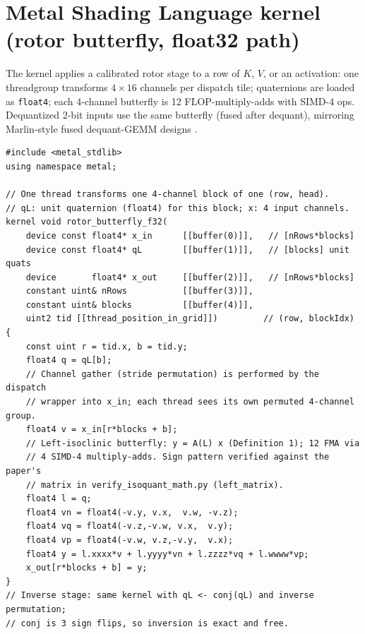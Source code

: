 \documentclass{article}
\begin{document}



\appendix

\section{Metal Shading Language kernel (rotor butterfly, float32 path)}
\label{app:msl}

The kernel applies a calibrated rotor stage to a row of $K$, $V$, or an
activation: one threadgroup transforms $4\times16$ channels per dispatch
tile; quaternions are loaded as \texttt{float4}; each 4-channel butterfly is
12 FLOP-multiply-adds with SIMD-4 ops. Dequantized 2-bit inputs use the same
butterfly (fused after dequant), mirroring Marlin-style fused dequant-GEMM
designs \citep{frantar2024marlin}.

\begin{lstlisting}[language=MSL,caption={Rotary-butterfly stage (left-rotor variant), MSL 3.1.}]
#include <metal_stdlib>
using namespace metal;

// One thread transforms one 4-channel block of one (row, head).
// qL: unit quaternion (float4) for this block; x: 4 input channels.
kernel void rotor_butterfly_f32(
    device const float4* x_in      [[buffer(0)]],   // [nRows*blocks]
    device const float4* qL        [[buffer(1)]],   // [blocks] unit quats
    device       float4* x_out     [[buffer(2)]],   // [nRows*blocks]
    constant uint& nRows           [[buffer(3)]],
    constant uint& blocks          [[buffer(4)]],
    uint2 tid [[thread_position_in_grid]])         // (row, blockIdx)
{
    const uint r = tid.x, b = tid.y;
    float4 q = qL[b];
    // Channel gather (stride permutation) is performed by the dispatch
    // wrapper into x_in; each thread sees its own permuted 4-channel group.
    float4 v = x_in[r*blocks + b];
    // Left-isoclinic butterfly: y = A(L) x (Definition 1); 12 FMA via
    // 4 SIMD-4 multiply-adds. Sign pattern verified against the paper's
    // matrix in verify_isoquant_math.py (left_matrix).
    float4 l = q;
    float4 vn = float4(-v.y, v.x,  v.w, -v.z);
    float4 vq = float4(-v.z,-v.w, v.x,  v.y);
    float4 vp = float4(-v.w, v.z,-v.y,  v.x);
    float4 y = l.xxxx*v + l.yyyy*vn + l.zzzz*vq + l.wwww*vp;
    x_out[r*blocks + b] = y;
}
// Inverse stage: same kernel with qL <- conj(qL) and inverse permutation;
// conj is 3 sign flips, so inversion is exact and free.
\end{lstlisting}
\end{document}
